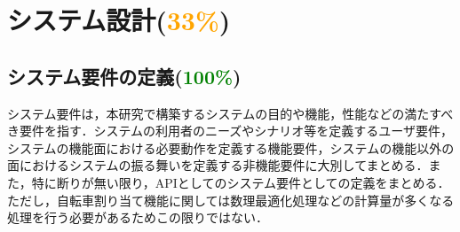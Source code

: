 \section{システム設計(\textcolor{orange}{33\%})}
  \label{sec:システム設計}
    \par
  
  \subsection{システム要件の定義(\textcolor{green}{100\%})}
    \label{sec:システム要件の定義}
      \par システム要件は，本研究で構築するシステムの目的や機能，性能などの満たすべき要件を指す．システムの利用者のニーズやシナリオ等を定義するユーザ要件，システムの機能面における必要動作を定義する機能要件，システムの機能以外の面におけるシステムの振る舞いを定義する非機能要件に大別してまとめる．また，特に断りが無い限り，APIとしてのシステム要件としての定義をまとめる．ただし，自転車割り当て機能に関しては数理最適化処理などの計算量が多くなる処理を行う必要があるためこの限りではない．


